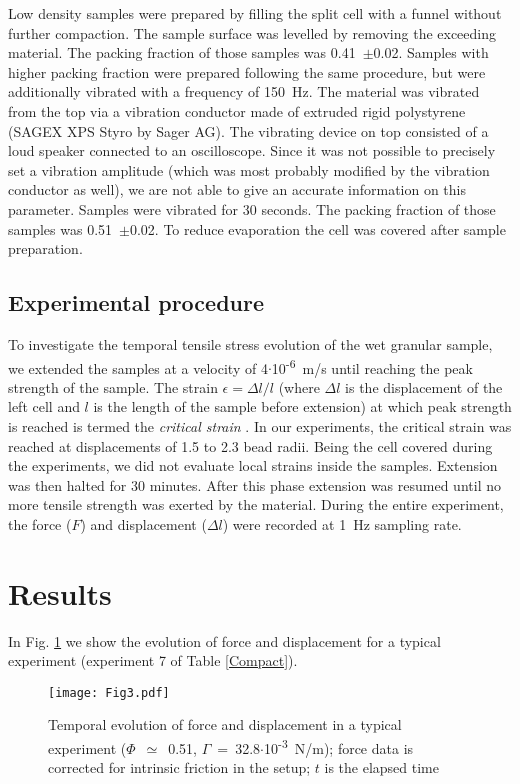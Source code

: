 Low density samples were prepared by filling the split cell with a funnel without further compaction. The sample surface was levelled by removing the exceeding material. The packing fraction of those samples was 0.41~$\pm$0.02. Samples with higher packing fraction were prepared following the same procedure, but were additionally vibrated with a frequency of 150~\si{\hertz}. The material was vibrated from the top via a vibration conductor made of extruded rigid polystyrene (SAGEX XPS Styro by Sager AG). The vibrating device on top consisted of a loud speaker connected to an oscilloscope. Since it was not possible to precisely set a vibration amplitude (which was most probably modified by the vibration conductor as well), we are not able to give an accurate information on this parameter. Samples were vibrated for 30 seconds. The packing fraction of those samples was 0.51~$\pm$0.02. To reduce evaporation the cell was covered after sample preparation.

\subsection{Experimental procedure}
\label{sec:Experimental procedure}

To investigate the temporal tensile stress evolution of the wet granular sample, we extended the samples at a velocity of 4$\cdot$10\textsuperscript{-6}~\si{m/s} until reaching the peak strength of the sample. The strain $\epsilon=\Delta l/l$ (where $\Delta l$ is the displacement of the left cell and $l$ is the length of the sample before extension) at which peak strength is reached is termed the \textit{critical strain} \cite{Mitarai2006}. In our experiments, the critical strain was reached at displacements of 1.5 to 2.3 bead radii. Being the cell covered during the experiments, we did not evaluate local strains inside the samples. Extension was then halted for 30 minutes. After this phase extension was resumed until no more tensile strength was exerted by the material. During the entire experiment, the force ($F$) and displacement ($\Delta l$) were recorded at 1~\si{\hertz} sampling rate.

\section{Results}
\label{sec:Results}

In Fig. \ref{Example} we show the evolution of force and displacement for a typical experiment (experiment 7 of Table \ref{Compact}).
\begin{figure}[h!]
\texttt{[image: Fig3.pdf]}
\caption{Temporal evolution of force and displacement in a typical experiment ($\Phi$~$\simeq$~0.51, $\Gamma$~=~32.8$\cdot$10\textsuperscript{-3}~\si{N/m}); force data is corrected for intrinsic friction in the setup; $t$ is the elapsed time}
\label{Example}
\end{figure}

